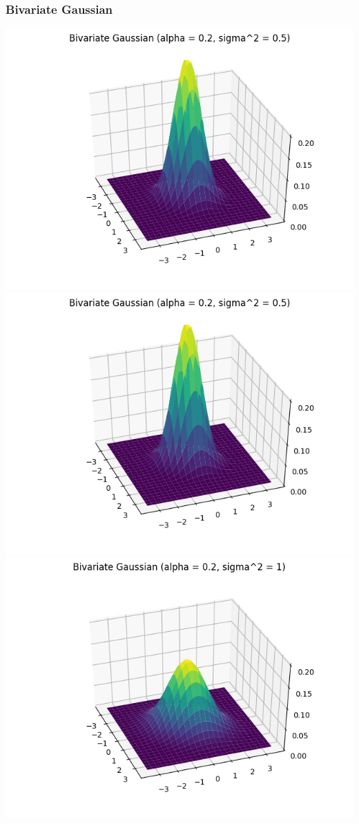 \documentclass{article}
\begin{document}
\subsubsection{Bivariate Gaussian}

\includegraphics[width=\linewidth]{Bivariate Gaussian (alpha = 0.2, sigma^2 = 0.5).png}
\includegraphics[width=\linewidth]{Bivariate Gaussian (alpha = 0.2, sigma^2 = 0.5).png}
\includegraphics[width=\linewidth]{Bivariate Gaussian (alpha = 0.2, sigma^2 = 1).png}
\end{document}
